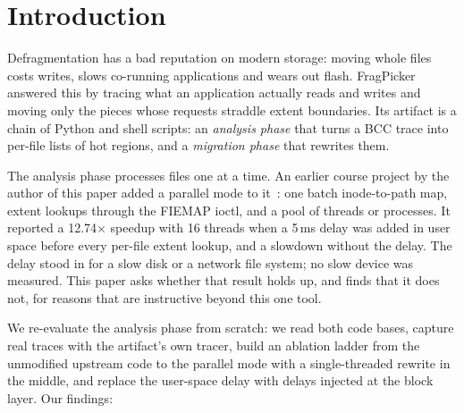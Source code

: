 \section{Introduction}
\label{sec:intro}

Defragmentation has a bad reputation on modern storage: moving whole files costs
writes, slows co-running applications and wears out flash. FragPicker~\cite{park2021fragpicker}
answered this by tracing what an application actually reads and writes and moving
only the pieces whose requests straddle extent boundaries. Its artifact is a chain of
Python and shell scripts: an \emph{analysis phase} that turns a BCC trace into
per-file lists of hot regions, and a \emph{migration phase} that rewrites them.

The analysis phase processes files one at a time. An earlier course project by the
author of this paper added a parallel mode to it~\cite{forkbranch}: one batch
inode-to-path map, extent lookups through the FIEMAP ioctl, and a pool of threads or
processes. It reported a 12.74$\times$ speedup with 16 threads when a 5\,ms delay was
added in user space before every per-file extent lookup, and a slowdown without the
delay. The delay stood in for a slow disk or a network file system; no slow device
was measured. This paper asks whether that result holds up, and finds that it does
not, for reasons that are instructive beyond this one tool.

We re-evaluate the analysis phase from scratch: we read both code bases, capture
real traces with the artifact's own tracer, build an ablation ladder from the
unmodified upstream code to the parallel mode with a single-threaded rewrite in the
middle, and replace the user-space delay with delays injected at the block layer.
Our findings:

